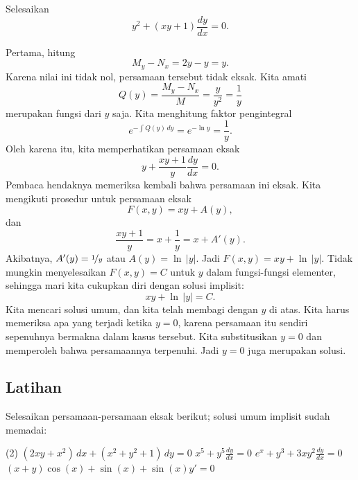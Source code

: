 \begin{example}
Selesaikan
\begin{equation*}
y^2 + (xy+1) \frac{dy}{dx} = 0 .
\end{equation*}

Pertama, hitung
\begin{equation*}
M_y-N_x = 2y-y = y .
\end{equation*}
Karena nilai ini tidak nol, persamaan tersebut tidak eksak.  Kita amati
\begin{equation*}
Q(y) = \frac{M_y-N_x}{M} = \frac{y}{y^2} = \frac{1}{y}
\end{equation*}
merupakan fungsi dari $y$ saja.    Kita menghitung faktor pengintegral
\begin{equation*}
e^{-\int  Q(y) \, dy}
=
e^{-\ln y} = \frac{1}{y} .
\end{equation*}
Oleh karena itu, kita memperhatikan persamaan eksak
\begin{equation*}
y + \frac{xy+1}{y} \frac{dy}{dx} = 0 .
\end{equation*}
Pembaca hendaknya memeriksa kembali bahwa persamaan ini eksak.
Kita mengikuti prosedur untuk persamaan eksak
\begin{equation*}
F(x,y) = xy + A(y) ,
\end{equation*}
dan
\begin{equation*}
\frac{xy+1}{y} = x+\frac{1}{y} = x+ A'(y) .
\end{equation*}
Akibatnya, $A'(y) = \nicefrac{1}{y}$ atau $A(y) = \ln \, \lvert y \rvert$.  Jadi $F(x,y)
= xy + \ln \, \lvert y \rvert$.
Tidak mungkin menyelesaikan $F(x,y)=C$ untuk $y$
dalam fungsi-fungsi elementer, sehingga
mari kita cukupkan diri dengan solusi implisit:
\begin{equation*}
xy + \ln \, \lvert y \rvert = C .
\end{equation*}
Kita mencari solusi umum, dan kita telah membagi dengan
$y$ di atas.  Kita harus memeriksa apa yang terjadi ketika $y=0$, karena persamaan itu sendiri
sepenuhnya bermakna dalam kasus tersebut.  Kita substitusikan $y=0$ dan memperoleh bahwa
persamaannya terpenuhi.  Jadi $y=0$ juga merupakan solusi.
\end{example}

\subsection{Latihan}

\begin{exercise}
Selesaikan persamaan-persamaan eksak berikut; solusi umum implisit
sudah memadai:
\begin{tasks}(2)
\task
$(2 xy + x^2) \, dx + (x^2+y^2+1) \, dy = 0$
\task
$x^5 + y^5 \frac{dy}{dx} = 0$
\task
$e^x+y^3 + 3xy^2 \frac{dy}{dx} = 0$
\task
$(x+y)\cos(x)+\sin(x) + \sin(x)y' = 0$
\end{tasks}
\end{exercise}

